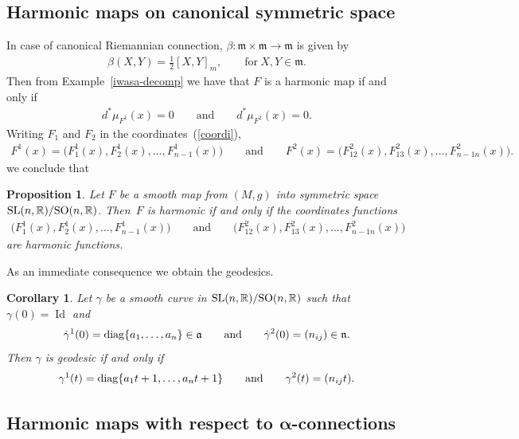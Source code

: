 \documentclass[pdftex]{sigma}
\numberwithin{equation}{section}
\newtheorem{Corollary}[Theorem]{Corollary}
\newtheorem{Proposition}[Theorem]{Proposition}
{ \theoremstyle{definition}
\newtheorem{Definition}[Theorem]{Definition}
\newtheorem{Example}[Theorem]{Example}
\newtheorem{Remark}[Theorem]{Remark}}
\newcommand{\m}{\mathfrak{m}}
\begin{document}
\subsection{Harmonic maps on canonical symmetric space}
In case of canonical Riemannian connection, $\beta\colon  \m \times \m \rightarrow \m$ is given by
\begin{gather*}%
  \beta(X,Y) = \frac{1}{2}[X,Y]_m ,\qquad \textrm{for} \  X,Y \in \m.
\end{gather*}
Then from Example~\ref{iwasa-decomp} we have that $F$ is a harmonic map if and only if
\begin{gather*}
  d^*\mu_{F^1}(x) = 0\qquad  \textrm{and}\qquad d^*\mu_{F^2}(x)=0.
\end{gather*}
Writing $F_1$ and $F_2$ in the coordinates~(\ref{coordi}),
\begin{gather*}
  F^1(x)   =   \big(F^1_1(x),F^1_2(x),\ldots,F^1_{n-1}(x)\big) \qquad \textrm{and} \qquad
  F^2(x)   =   \big(F^2_{12}(x),F^2_{13}(x), \ldots,F^2_{n-1n}(x)\big).
\end{gather*}
we conclude that
\begin{Proposition}
  Let $F$ be a smooth map from $(M,g)$ into symmetric space ${\rm SL}(n,\mathbb{R})/{\rm SO}(n,\mathbb{R})$. Then~$F$ is harmonic if and only if the coordinates functions
  \begin{gather*}
   \big(F^1_1(x),F^1_2(x),\ldots,F^1_{n-1}(x)\big) \qquad \textrm{and} \qquad \big(F^2_{12}(x),F^2_{13}(x), \ldots,F^2_{n-1n}(x)\big)
  \end{gather*}
  are harmonic functions.
\end{Proposition}

As an immediate consequence we obtain the geodesics.
\begin{Corollary}
  Let $\gamma$ be a smooth curve in ${\rm SL}(n,\mathbb{R})/{\rm SO}(n,\mathbb{R})$ such that $\gamma(0) = \operatorname{Id}$ and
  \begin{gather*}
   \dot{\gamma}^1(0) ={\rm diag}\{a_1, \ldots, a_n\} \in \mathfrak{a} \qquad \mbox{and} \qquad \dot{\gamma}^2(0) = (n_{ij}) \in \mathfrak{n}.
  \end{gather*}
  Then $\gamma$ is geodesic if and only if
  \begin{gather*}
   \gamma^1(t) ={\rm diag}\{a_1t +1, \ldots, a_nt +1\} \qquad \mbox{and} \qquad \gamma^2(t)= (n_{ij}t).
  \end{gather*}
\end{Corollary}


\subsection[Harmonic maps with respect to $\alpha$-connections]{Harmonic maps with respect to $\boldsymbol{\alpha}$-connections}
\end{document}
